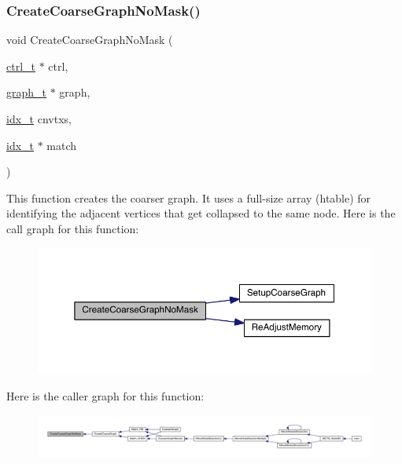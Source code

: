 \subsubsection{\texorpdfstring{Create\+Coarse\+Graph\+No\+Mask()}{CreateCoarseGraphNoMask()}}
{\footnotesize\ttfamily void Create\+Coarse\+Graph\+No\+Mask (\begin{DoxyParamCaption}\item[{\hyperlink{a00742}{ctrl\+\_\+t} $\ast$}]{ctrl,  }\item[{\hyperlink{a00734}{graph\+\_\+t} $\ast$}]{graph,  }\item[{\hyperlink{a00876_aaa5262be3e700770163401acb0150f52}{idx\+\_\+t}}]{cnvtxs,  }\item[{\hyperlink{a00876_aaa5262be3e700770163401acb0150f52}{idx\+\_\+t} $\ast$}]{match }\end{DoxyParamCaption})}

This function creates the coarser graph. It uses a full-\/size array (htable) for identifying the adjacent vertices that get collapsed to the same node. Here is the call graph for this function\+:\nopagebreak
\begin{figure}[H]
\begin{center}
\leavevmode
\includegraphics[width=350pt]{a00945_a70dc59d4c7190507e7ad9a4cc0d80707_cgraph}
\end{center}
\end{figure}
Here is the caller graph for this function\+:\nopagebreak
\begin{figure}[H]
\begin{center}
\leavevmode
\includegraphics[width=350pt]{a00945_a70dc59d4c7190507e7ad9a4cc0d80707_icgraph}
\end{center}
\end{figure}
\mbox{\label{a00945_a0aba484ba693edd6d56426d04bd7fd4b}} 
